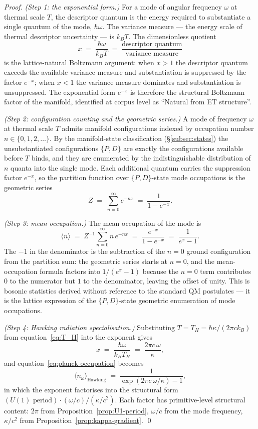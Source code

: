 \documentclass[11pt,a4paper]{article}
\theoremstyle{definition}
\theoremstyle{remark}
\begin{document}
\begin{proof}
\emph{(Step 1: the exponential form.)} For a mode of angular frequency $\omega$ at thermal scale $T$, the descriptor quantum is the energy required to substantiate a single quantum of the mode, $\hbar\omega$. The variance measure --- the energy scale of thermal descriptor uncertainty --- is $k_{B}T$. The dimensionless quotient
\[
x \;=\; \frac{\hbar\omega}{k_{B}T} \;=\; \frac{\text{descriptor quantum}}{\text{variance measure}}
\]
is the lattice-natural Boltzmann argument: when $x > 1$ the descriptor quantum exceeds the available variance measure and substantiation is suppressed by the factor $e^{-x}$; when $x < 1$ the variance measure dominates and substantiation is unsuppressed. The exponential form $e^{-x}$ is therefore the structural Boltzmann factor of the manifold, identified at corpus level as ``Natural from ET structure''.

\emph{(Step 2: configuration counting and the geometric series.)} A mode of frequency $\omega$ at thermal scale $T$ admits manifold configurations indexed by occupation number $n \in \{0,1,2,\ldots\}$. By the manifold-state classification (\S\ref{subsec:states}) the unsubstantiated configurations $\{P,D\}$ are exactly the configurations available before $T$ binds, and they are enumerated by the indistinguishable distribution of $n$ quanta into the single mode. Each additional quantum carries the suppression factor $e^{-x}$, so the partition function over $\{P,D\}$-state mode occupations is the geometric series
\[
Z \;=\; \sum_{n=0}^{\infty} e^{-nx} \;=\; \frac{1}{1 - e^{-x}}.
\]

\emph{(Step 3: mean occupation.)} The mean occupation of the mode is
\[
\langle n\rangle \;=\; Z^{-1}\sum_{n=0}^{\infty} n\,e^{-nx} \;=\; \frac{e^{-x}}{1-e^{-x}} \;=\; \frac{1}{e^{x}-1}.
\]
The $-1$ in the denominator is the subtraction of the $n=0$ ground configuration from the partition sum: the geometric series starts at $n=0$, and the mean-occupation formula factors into $1/(e^{x}-1)$ because the $n=0$ term contributes $0$ to the numerator but $1$ to the denominator, leaving the offset of unity. This is bosonic statistics derived without reference to the standard QM postulates --- it is the lattice expression of the $\{P,D\}$-state geometric enumeration of mode occupations.

\emph{(Step 4: Hawking radiation specialisation.)} Substituting $T = T_{H} = \hbar\kappa/(2\pi c k_{B})$ from equation~\eqref{eq:T_H} into the exponent gives
\[
x \;=\; \frac{\hbar\omega}{k_{B}T_{H}} \;=\; \frac{2\pi c\,\omega}{\kappa},
\]
and equation~\eqref{eq:planck-occupation} becomes
\[
\langle n_{\omega}\rangle_{\text{Hawking}} \;=\; \frac{1}{\exp(2\pi c\,\omega/\kappa) - 1},
\]
in which the exponent factorises into the structural form $(\text{$U(1)$ period}) \cdot (\omega/c) / (\kappa/c^{2})$. Each factor has primitive-level structural content: $2\pi$ from Proposition~\ref{prop:U1-period}, $\omega/c$ from the mode frequency, $\kappa/c^{2}$ from Proposition~\ref{prop:kappa-gradient}. \qed
\end{proof}
\end{document}

